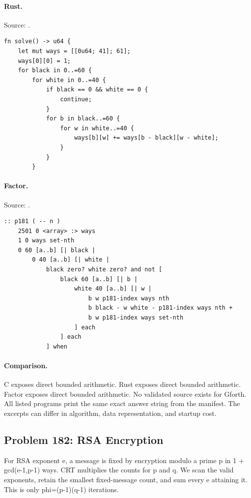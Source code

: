\paragraph{Rust.} Source: .
\begin{lstlisting}
fn solve() -> u64 {
    let mut ways = [[0u64; 41]; 61];
    ways[0][0] = 1;
    for black in 0..=60 {
        for white in 0..=40 {
            if black == 0 && white == 0 {
                continue;
            }
            for b in black..=60 {
                for w in white..=40 {
                    ways[b][w] += ways[b - black][w - white];
                }
            }
        }
\end{lstlisting}

\paragraph{Factor.} Source: .
\begin{lstlisting}
:: p181 ( -- n )
    2501 0 <array> :> ways
    1 0 ways set-nth
    0 60 [a..b] [| black |
        0 40 [a..b] [| white |
            black zero? white zero? and not [
                black 60 [a..b] [| b |
                    white 40 [a..b] [| w |
                        b w p181-index ways nth
                        b black - w white - p181-index ways nth +
                        b w p181-index ways set-nth
                    ] each
                ] each
            ] when
\end{lstlisting}

\paragraph{Comparison.}
C exposes direct bounded arithmetic. Rust exposes direct bounded arithmetic. Factor exposes direct bounded arithmetic.
No validated source exists for Gforth.
All listed programs print the same exact answer string from the manifest. The excerpts can differ in algorithm, data representation, and startup cost.

\subsection{Problem 182: RSA Encryption}
\label{walkthrough:p182}
For RSA exponent e, a message is fixed by encryption modulo a prime p in 1 + gcd(e-1,p-1) ways. CRT multiplies the counts for p and q. We scan the valid exponents, retain the smallest fixed-message count, and sum every e attaining it. This is only phi=(p-1)(q-1) iterations.

